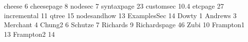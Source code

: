 \fdef cheese {6}
\fdef cheesepage {8}
\fdef nodesec {7}
\fdef syntaxpage {23}
\fdef customsec {10.4}
\fdef etcpage {27}
\fdef incremental {11}
\fdef qtree {15}
\fdef nodesandhow {13}
\fdef ExamplesSec {14}
\fdef Dowty {1}
\fdef Andrews {3}
\fdef Merchant {4}
\fdef Chung2 {6}
\fdef Schutze {7}
\fdef Richards {9}
\fdef Richardspage {46}
\fdef Zubi {10}
\fdef Frampton1 {13}
\fdef Frampton2 {14}
